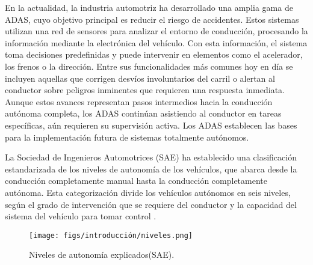 En la actualidad, la industria automotriz ha desarrollado una amplia gama de \ac{ADAS}, cuyo objetivo principal es reducir el riesgo de accidentes. Estos sistemas utilizan una red de sensores para analizar el entorno de conducción, procesando la información mediante la electrónica del vehículo. Con esta información, el sistema toma decisiones predefinidas y puede intervenir en elementos como el acelerador, los frenos o la dirección. Entre sus funcionalidades más comunes hoy en día se incluyen aquellas que corrigen desvíos involuntarios del carril o alertan al conductor sobre peligros inminentes que requieren una respuesta inmediata. Aunque estos avances representan pasos intermedios hacia la conducción autónoma completa, los \ac{ADAS} continúan asistiendo al conductor en tareas específicas, aún requieren su supervisión activa. Los \ac{ADAS} establecen las bases para la implementación futura de sistemas totalmente autónomos.

La Sociedad de Ingenieros Automotrices (\ac{SAE}) ha establecido una clasificación estandarizada de los niveles de autonomía de los vehículos, que abarca desde la conducción completamente manual hasta la conducción completamente autónoma. Esta categorización divide los vehículos autónomos en seis niveles, según el grado de intervención que se requiere del conductor y la capacidad del sistema del vehículo para tomar control \cite{autobild-autonomous}.

\begin{figure} [ht]
  \begin{center}
    \texttt{[image: figs/introducción/niveles.png]}
  \end{center}
  \caption{Niveles de autonomía explicados(\ac{SAE}).}
  \label{aut-levels}
  \end{figure}


